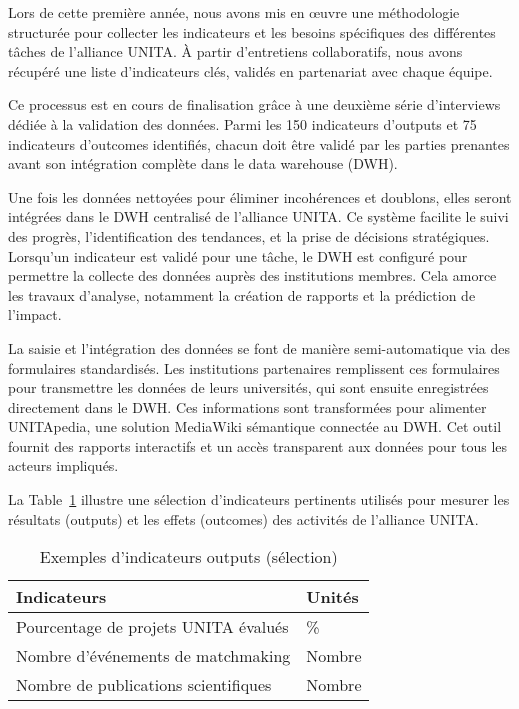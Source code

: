 Lors de cette première année, nous avons mis en œuvre une méthodologie structurée pour collecter les indicateurs et les besoins spécifiques des différentes tâches de l’alliance UNITA. À partir d'entretiens collaboratifs, nous avons récupéré une liste d’indicateurs clés, validés en partenariat avec chaque équipe.

Ce processus est en cours de finalisation grâce à une deuxième série d’interviews dédiée à la validation des données. Parmi les 150 indicateurs d’outputs et 75 indicateurs d’outcomes identifiés, chacun doit être validé par les parties prenantes avant son intégration complète dans le data warehouse (DWH).

Une fois les données nettoyées pour éliminer incohérences et doublons, elles seront intégrées dans le DWH centralisé de l’alliance UNITA. Ce système facilite le suivi des progrès, l’identification des tendances, et la prise de décisions stratégiques. Lorsqu’un indicateur est validé pour une tâche, le DWH est configuré pour permettre la collecte des données auprès des institutions membres. Cela amorce les travaux d’analyse, notamment la création de rapports et la prédiction de l’impact.

La saisie et l’intégration des données se font de manière semi-automatique via des formulaires standardisés. Les institutions partenaires remplissent ces formulaires pour transmettre les données de leurs universités, qui sont ensuite enregistrées directement dans le DWH. Ces informations sont transformées pour alimenter UNITApedia, une solution MediaWiki sémantique connectée au DWH. Cet outil fournit des rapports interactifs et un accès transparent aux données pour tous les acteurs impliqués.

La Table~\ref{tab:indic_ex} illustre une sélection d’indicateurs pertinents utilisés pour mesurer les résultats (outputs) et les effets (outcomes) des activités de l’alliance UNITA.

\begin{table}[h]
    \caption{Exemples d’indicateurs outputs (sélection)}
    \centering
    \begin{tabular}{|l|l|}
        \hline
        \textbf{Indicateurs} & \textbf{Unités} \\ \hline
        Pourcentage de projets UNITA évalués & \% \\ \hline
        Nombre d’événements de matchmaking & Nombre \\ \hline
        Nombre de publications scientifiques & Nombre \\ \hline
    \end{tabular}
    \label{tab:indic_ex}
\end{table}
